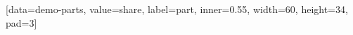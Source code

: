 \documentclass{article}
\begin{document}
\ExplSyntaxOn
\SemioVizProbeOn
\SemioVizChartsDryRun
{}
[data=demo-parts, value=share, label=part, inner=0.55, width=60, height=34, pad=3]
\ExplSyntaxOff
\end{document}
